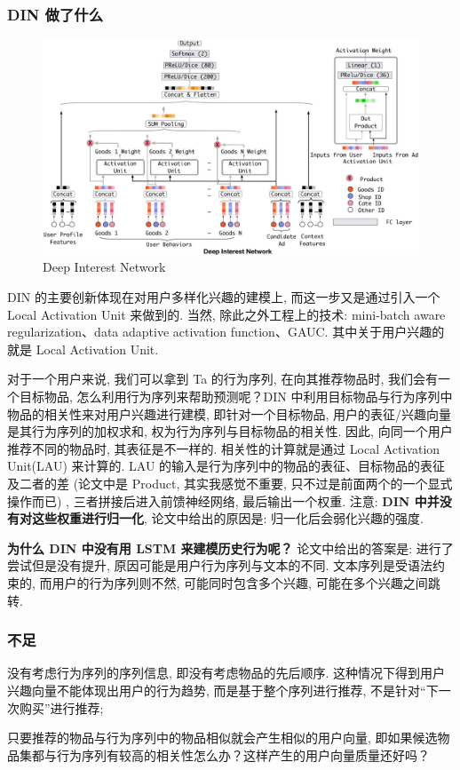 \subsubsection{DIN 做了什么}

\begin{figure}[h]
	\centering
	\includegraphics[width=\textwidth]{pics/din.jpg}
	\caption{Deep Interest Network}
	\label{fig:din}
\end{figure}

DIN 的主要创新体现在对用户多样化兴趣的建模上, 而这一步又是通过引入一个 Local Activation Unit 来做到的. 当然, 除此之外工程上的技术: mini-batch aware regularization、data adaptive activation function、GAUC. 其中关于用户兴趣的就是 Local Activation Unit. 

对于一个用户来说, 我们可以拿到 Ta 的行为序列, 在向其推荐物品时, 我们会有一个目标物品, 怎么利用行为序列来帮助预测呢？DIN 中利用目标物品与行为序列中物品的相关性来对用户兴趣进行建模, 即针对一个目标物品, 用户的表征/兴趣向量是其行为序列的加权求和, 权为行为序列与目标物品的相关性. 因此, 向同一个用户推荐不同的物品时, 其表征是不一样的. 相关性的计算就是通过 Local Activation Unit(LAU) 来计算的. LAU 的输入是行为序列中的物品的表征、目标物品的表征及二者的差 (论文中是 Product, 其实我感觉不重要, 只不过是前面两个的一个显式操作而已) , 三者拼接后进入前馈神经网络, 最后输出一个权重. 注意: \textbf{DIN 中并没有对这些权重进行归一化}, 论文中给出的原因是: 归一化后会弱化兴趣的强度. 

\textbf{为什么 DIN 中没有用 LSTM 来建模历史行为呢？} 论文中给出的答案是: 进行了尝试但是没有提升, 原因可能是用户行为序列与文本的不同. 文本序列是受语法约束的, 而用户的行为序列则不然, 可能同时包含多个兴趣, 可能在多个兴趣之间跳转. 

\subsubsection{不足}
\begin{myitemize}
	\item 没有考虑行为序列的序列信息, 即没有考虑物品的先后顺序. 这种情况下得到用户兴趣向量不能体现出用户的行为趋势, 而是基于整个序列进行推荐, 不是针对“下一次购买”进行推荐; 
	
	\item 只要推荐的物品与行为序列中的物品相似就会产生相似的用户向量, 即如果候选物品集都与行为序列有较高的相关性怎么办？这样产生的用户向量质量还好吗？
\end{myitemize}

